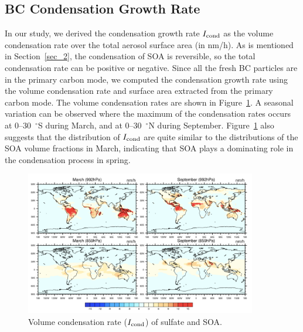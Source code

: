 \documentclass[12pt, fullpage]{uiucthesis2009}
\begin{document}
	\subsection{BC Condensation Growth Rate}\label{sec_3}		
	In our study, we derived the condensation growth rate $I_{\rm cond}$ as the volume condensation rate over the total aerosol surface area (in nm/h). As is mentioned in Section~\ref{sec_2}, the condensation of SOA is reversible, so the total condensation rate can be positive or negative. Since all the fresh BC particles are in the primary carbon mode, we computed the condensation growth rate using the volume condensation rate and surface area extracted from the primary carbon mode. The volume condensation rates are shown in Figure~\ref{fig_p24}. A seasonal variation can be observed where the maximum of the condensation rates occurs at 0--30~$^\circ$S during March, and at 0--30~$^\circ$N during September. Figure~\ref{fig_p24} also suggests that the distribution of $I_{\rm cond}$ are quite similar to the distributions of the SOA volume fractions in March, indicating that SOA plays a dominating role in the condensation process in spring. 
	\begin{figure}[h] 
		\begin{center}
			\includegraphics[width = 0.9\textwidth]{Figure24}
			\caption[Volume condensation rate ($I_{\rm cond}$) of sulfate and SOA]{\label{fig_p24} Volume condensation rate ($I_{\rm cond}$) of sulfate and SOA.}
		\end{center}
	\end{figure}
	
		
\end{document}

